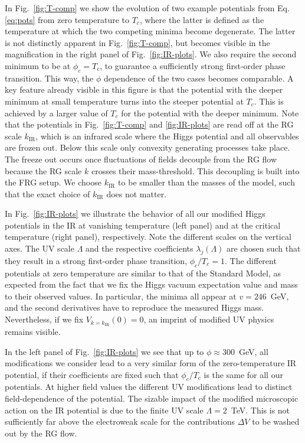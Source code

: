 \documentclass[aps,prd,11pt,tightenlines,superscriptaddress,nofootinbib,preprintnumbers,notitlepage]{revtex4-1}
\begin{document}
In Fig.~\ref{fig:T-comp} we show the evolution of two example
potentials from Eq.\eqref{eq:pots} from zero temperature to $T_c$,
where the latter is defined as the temperature at which the two
competing minima become degenerate. The latter is not distinctly
apparent in Fig.~\ref{fig:T-comp}, but becomes visible in the
magnification in the right panel of Fig.~\ref{fig:IR-plots}.  We also
require the second minimum to be at $\phi_c= T_c$, to guarantee a
sufficiently strong first-order phase transition. This way, the $\phi$
dependence of the two cases becomes comparable.  A key feature already
visible in this figure is that the potential with the deeper minimum
at small temperature turns into the steeper potential at $T_c$.  This
is achieved by a larger value of $T_c$ for the potential with the
deeper minimum.
Note that the potentials in Fig.~\ref{fig:T-comp} and \ref{fig:IR-plots}
are read off at the RG scale $k_\text{IR}$, which is an infrared scale where
the Higgs potential and all observables are frozen out. Below this
scale only convexity generating processes take place. The freeze out occurs once 
fluctuations of fields decouple from the RG flow because the RG scale $k$ crosses their 
mass-threshold. This decoupling is built into the FRG setup. We choose $k_\text{IR}$
to be smaller than the masses of the model, such that the exact choice of $k_\text{IR}$
does not matter.

In Fig.~\ref{fig:IR-plots} we illustrate the behavior of all our
modified Higgs potentials in the IR at vanishing temperature (left
panel) and at the critical temperature (right panel), respectively.
Note the different scales on the vertical axes. The UV scale $\Lambda$
and the respective coefficients $\lambda_j (\Lambda)$ are chosen such
that they result in a strong first-order phase transition,
$\phi_c/T_c=1$.  The different potentials at zero temperature are
similar to that of the Standard Model, as expected from the fact that
we fix the Higgs vacuum expectation value and mass to their observed
values. In particular, the minima all appear at $v = 246$~GeV, and the
second derivatives have to reproduce the measured Higgs mass.
Nevertheless, if we fix $V_{k=k_\text{IR}}(0) = 0$, an imprint of
modified UV physics remains visible.

In the left panel of Fig.~\ref{fig:IR-plots} we see that up to
$\phi \approx 300$~GeV, all modifications we consider lead to a very
similar form of the zero-temperature IR potential, if their
coefficients are fixed such that $\phi_c/T_c$ is the same for all our
potentials. At higher field values the different UV modifications lead
to distinct field-dependence of the potential. The sizable impact of
the modified microscopic action on the IR potential is due to the
finite UV scale $\Lambda = 2$~TeV. This is not sufficiently far above
the electroweak scale for the contributions $\Delta V$ to be washed
out by the RG flow. \medskip
\end{document}
